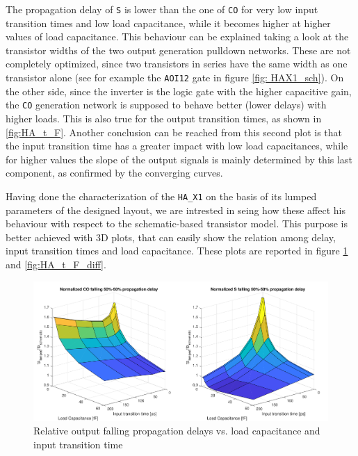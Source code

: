 \documentclass[a4paper]{article}
\newcommand{\ha}{\texttt{HA\_X1}\xspace}
\begin{document}
The propagation delay of \texttt{S} is lower than the one of \texttt{CO} for very low input transition times and low load capacitance, while it becomes higher at higher values of load capacitance. This behaviour can be explained taking a look at the transistor widths of the two output generation pulldown networks. These are not completely optimized, since two transistors in series have the same width as one transistor alone (see for example the \texttt{AOI12} gate in figure \ref{fig: HAX1_sch}). On the other side, since the inverter is the logic gate with the higher capacitive gain, the \texttt{CO} generation network is supposed to behave better (lower delays) with higher loads. This is also true for the output transition times, as shown in \ref{fig:HA_t_F}. Another conclusion can be reached from this second plot is that the input transition time has a greater impact with low load capacitances, while for higher values the slope of the output signals is mainly determined by this last component, as confirmed by the converging curves.

Having done the characterization of the \ha on the basis of its lumped parameters of the designed layout, we are intrested in seing how these affect his behaviour with respect to the schematic-based transistor model. This purpose is better achieved with 3D plots, that can easily show the relation among delay, input transition times and load capacitance. These plots are reported in figure \ref{fig:HA_tp_L_diff} and \ref{fig:HA_t_F_diff}.

\begin{figure}[ht]
	\includegraphics[width=\linewidth]{Images/HA/tp_L_diff_crop.pdf}
	\caption{Relative output falling propagation delays vs. load capacitance and input transition time}
	\label{fig:HA_tp_L_diff}
\end{figure}
\end{document}
